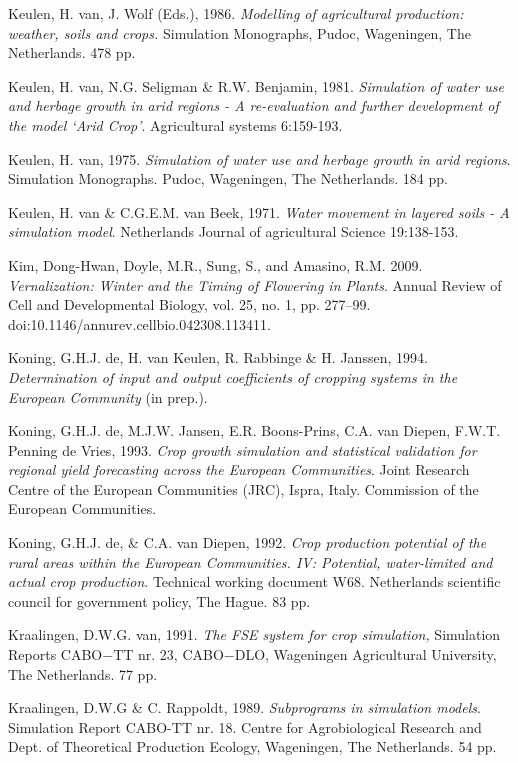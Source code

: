 Keulen, H. van, J. Wolf (Eds.), 1986. {\it Modelling of agricultural production: weather, soils and
crops.\/} Simulation Monographs, Pudoc, Wageningen, The Netherlands. 478 pp. 

Keulen, H. van, N.G. Seligman \& R.W. Benjamin, 1981. {\it Simula\-tion of water use and herbage
growth in arid\/} {\it regions - A re-evaluation and further development of the model `Arid Crop'\/}.
Agricultural systems 6:159-193.

Keulen, H. van, 1975. {\it Simulation of water use and herbage growth in arid regions\/}. Simulation
Monographs. Pudoc, Wageningen, The Netherlands. 184 pp.

Keulen, H. van \& C.G.E.M. van Beek, 1971. {\it Water movement in layered soils - A simulation model\/}.
Netherlands Journal of agricultural Science 19:138-153.

Kim, Dong-Hwan, Doyle, M.R., Sung, S., and Amasino, R.M. 2009.
\textit{Vernalization: Winter and the Timing of Flowering in Plants}. Annual Review of Cell and Developmental Biology, 
vol. 25, no. 1, pp. 277–99. doi:10.1146/annurev.cellbio.042308.113411.

Koning, G.H.J. de, H. van Keulen, R. Rabbinge \& H. Janssen, 1994. {\it Determination of input and
output coefficients of cropping systems in the European Community\/} (in prep.).

Koning, G.H.J. de, M.J.W. Jansen, E.R. Boons-Prins, C.A. van Diepen, F.W.T. Penning de Vries,
1993. {\it Crop growth simulation and statistical validation for regional yield forecasting across the
European Communities\/}. Joint Research Centre of the European Communities (JRC), Ispra, Italy.
Commission of the European Communities.

Koning, G.H.J. de, \& C.A. van Diepen, 1992. {\it Crop production potential of the rural areas within
the European Commun\-ities. IV: Potential, water-limited and actual crop production\/}. Technical
working document W68. Netherlands scientific council for government policy, The Hague. 83 pp.

Kraalingen, D.W.G. van, 1991. {\it The FSE system for crop simulation,\/} Simulation Reports CABO$-$TT
nr. 23, CABO$-$DLO, Wageningen Agricultural University, The Netherlands. 77 pp. 

Kraalingen, D.W.G \& C. Rappoldt, 1989. {\it Subprograms in simulation models\/}. Simulation Report
CABO-TT nr. 18. Centre for Agrobiological Research and Dept. of Theoretical Production Ecology,
Wageningen, The Netherlands. 54 pp.

